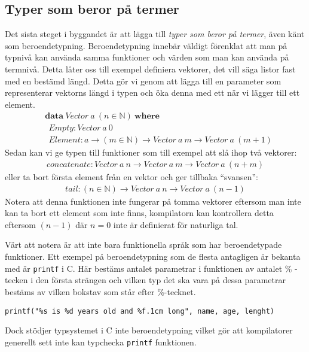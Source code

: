 \subsection{Typer som beror på termer}
Det sista steget i byggandet är att lägga till \emph{typer som beror på
termer}, även känt som beroendetypning. Beroendetypning innebär väldigt
förenklat att man på typnivå kan använda samma funktioner och värden som man
kan använda på termnivå. Detta låter oss till exempel definiera vektorer, det
vill säga listor fast med en bestämd längd. Detta gör vi genom att lägga till
en parameter som representerar vektorns längd i typen och öka denna med ett när
vi lägger till ett element.
\begin{align*}
  &\boldsymbol{data}\ Vector\ a\ (n \in \mathbb{N})\ \boldsymbol{where} \\
  &\ \ Empty : Vector\ a\ 0 \\
  &\ \ Element : a \to (m \in \mathbb{N}) \to Vector\ a\ m \to Vector\ a\ (m+1)
\end{align*}
Sedan kan vi ge typen till funktioner som till exempel att slå ihop två
vektorer:
\begin{align*}
  concatenate : Vector\ a\ n \to Vector\ a\ m \to Vector\ a\ (n+m)
\end{align*}
eller ta bort första element från en vektor och ger tillbaka ``svansen'':
\begin{align*}
  tail : (n \in \mathbb{N}) \to Vector\ a\ n \to Vector\ a\ (n-1)
\end{align*}
Notera att denna funktionen inte fungerar på tomma vektorer eftersom man inte
kan ta bort ett element som inte finns, kompilatorn kan kontrollera detta
eftersom $(n-1)$ där $n=0$ inte är definierat för naturliga tal.

Värt att notera är att inte bara funktionella språk som har beroendetypade
funktioner. Ett exempel på beroendetypning som de flesta antagligen är bekanta
med är \texttt{printf} i \textsc{C}. Här bestäms antalet parametrar i funktionen
av antalet \% -tecken i den första strängen och vilken typ det ska vara på
dessa parametrar bestäms av vilken bokstav som står efter \%-tecknet.
\begin{verbatim}
printf("%s is %d years old and %f.1cm long", name, age, lenght)
\end{verbatim}
Dock stödjer typsystemet i \textsc{C} inte beroendetypning vilket gör att
kompilatorer generellt sett inte kan typchecka \texttt{printf} funktionen.


